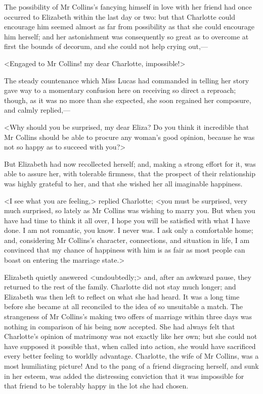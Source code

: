 The possibility of Mr Collins's fancying himself in love with her friend had once occurred to Elizabeth within the last day or two: but that Charlotte could encourage him seemed almost as far from possibility as that she could encourage him herself; and her astonishment was consequently so great as to overcome at first the bounds of decorum, and she could not help crying out,—

<Engaged to Mr Collins! my dear Charlotte, impossible!>

The steady countenance which Miss Lucas had commanded in telling her story gave way to a momentary confusion here on receiving so direct a reproach; though, as it was no more than she expected, she soon regained her composure, and calmly replied,—

<Why should you be surprised, my dear Eliza? Do you think it incredible that Mr Collins should be able to procure any woman's good opinion, because he was not so happy as to succeed with you?>

But Elizabeth had now recollected herself; and, making a strong effort for it, was able to assure her, with tolerable firmness, that the prospect of their relationship was highly grateful to her, and that she wished her all imaginable happiness.

<I see what you are feeling,> replied Charlotte; <you must be surprised, very much surprised, so lately as Mr Collins was wishing to marry you. But when you have had time to think it all over, I hope you will be satisfied with what I have done. I am not romantic, you know. I never was. I ask only a comfortable home; and, considering Mr Collins's character, connections, and situation in life, I am convinced that my chance of happiness with him is as fair as most people can boast on entering the marriage state.>

Elizabeth quietly answered <undoubtedly;> and, after an awkward pause, they returned to the rest of the family. Charlotte did not stay much longer; and Elizabeth was then left to reflect on what she had heard. It was a long time before she became at all reconciled to the idea of so unsuitable a match. The strangeness of Mr Collins's making two offers of marriage within three days was nothing in comparison of his being now accepted. She had always felt that Charlotte's opinion of matrimony was not exactly like her own; but she could not have supposed it possible that, when called into action, she would have sacrificed every better feeling to worldly advantage. Charlotte, the wife of Mr Collins, was a most humiliating picture! And to the pang of a friend disgracing herself, and sunk in her esteem, was added the distressing conviction that it was impossible for that friend to be tolerably happy in the lot she had chosen.